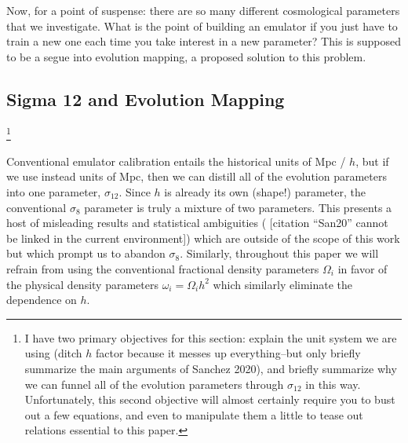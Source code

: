 \documentclass[11pt]{article}
\newcommand{\cbib}[1]
{\IfFileExists{biblatex.sty}
{\cite{#1}}
{[citation ``#1'' cannot be linked in the current environment]}}
\begin{document}
Now, for a point of suspense: there are so many different cosmological
parameters that we investigate. What is the point of building an emulator if
you just have to train a new one each time you take interest in a new
parameter? This is supposed to be a segue into evolution mapping, a proposed
solution to this problem.

\begin{centering}
\section{Sigma 12 and Evolution Mapping}
\label{sec: sigma_and_evMapping}
\end{centering}

\footnote{
    I have two primary objectives for this section: explain the unit system
    we are using (ditch $h$ factor because it messes up everything--but
    only briefly summarize the main arguments of Sanchez 2020), and briefly
    summarize why we can funnel all of the evolution parameters through
    $\sigma_{12}$ in this way. Unfortunately, this second objective will
    almost certainly require you to bust out a few equations, and even to
    manipulate them a little to tease out relations essential to this paper.
}

Conventional emulator calibration entails the historical units of Mpc / $h$,
but if we use instead units of Mpc, then we can distill all of the evolution
parameters into one parameter, $\sigma_{12}$. Since $h$ is already its own
(shape!) parameter, the conventional $\sigma_8$ parameter is truly a mixture
of two parameters. This presents a host of misleading results  and statistical
ambiguities (\cbib{San20}) which are outside of the scope of this work but
which prompt us to abandon $\sigma_8$.
Similarly, throughout this paper we will refrain from using the conventional
fractional density parameters $\Omega_i$ in favor of the physical density
parameters $\omega_i = \Omega_i h^2$ which similarly eliminate the
dependence on $h$.
\end{document}

